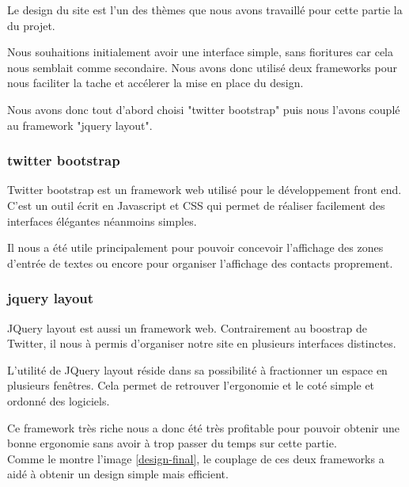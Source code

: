 Le design du site est l'un des thèmes que nous avons travaillé pour cette partie la du projet. 

Nous souhaitions initialement avoir une interface simple, sans fioritures car cela nous semblait comme
secondaire. Nous avons donc utilisé deux frameworks pour nous faciliter la tache et accélerer la mise
en place du design.

Nous avons donc tout d'abord choisi "twitter bootstrap" puis nous l'avons couplé au framework "jquery
layout".
\\


\subsubsection{twitter bootstrap}

Twitter bootstrap est un framework web utilisé pour le développement front end. C'est un outil écrit en
Javascript et CSS qui permet de réaliser facilement des interfaces élégantes néanmoins simples. 

Il nous a été utile principalement pour pouvoir concevoir l'affichage des zones d'entrée de textes ou 
encore pour organiser l'affichage des contacts proprement.
\\


\subsubsection{jquery layout}

JQuery layout est aussi un framework web. Contrairement au boostrap de Twitter, il nous à permis d'organiser 
notre site en plusieurs interfaces distinctes. 

L'utilité de JQuery layout réside dans sa possibilité à fractionner un espace en plusieurs fenêtres. Cela 
permet de retrouver l'ergonomie et le coté simple et ordonné des logiciels. 

Ce framework très riche nous a donc été très profitable pour pouvoir obtenir une bonne ergonomie sans avoir
à trop passer du temps sur cette partie.
\\


Comme le montre l'image \ref{design-final}, le couplage de ces deux frameworks a aidé à obtenir un design simple mais efficient. 



